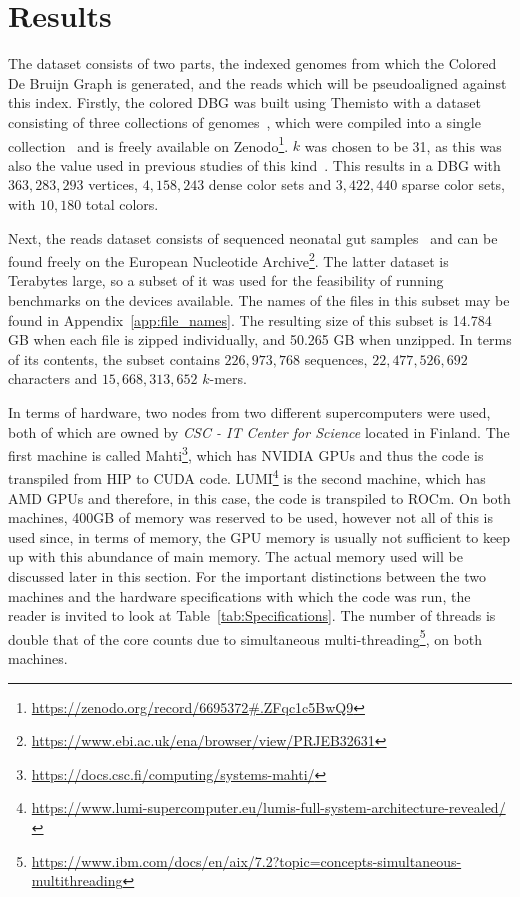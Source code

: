 \chapter{Results}\label{ch:Results}

The dataset consists of two parts, the indexed genomes from which the Colored De Bruijn Graph is generated, and the reads which will be pseudoaligned against this index.
Firstly, the colored DBG was built using Themisto with a dataset consisting of three collections of genomes~\cite{ecoli_genomes_1, ecoli_genomes_2, ecoli_genomes_3}, which were compiled into a single collection~\cite{genomes_compilation} and is freely available on Zenodo\footnote{\url{https://zenodo.org/record/6695372#.ZFqc1c5BwQ9}}.
$k$ was chosen to be 31, as this was also the value used in previous studies of this kind~\cite{Harri, SBWT}.
This results in a DBG with $363,283,293$ vertices, $4,158,243$ dense color sets and $3,422,440$ sparse color sets, with $10,180$ total colors.

Next, the reads dataset consists of sequenced neonatal gut samples~\cite{ecoli_genomes_3} and can be found freely on the European Nucleotide Archive\footnote{\url{https://www.ebi.ac.uk/ena/browser/view/PRJEB32631}}.
The latter dataset is Terabytes large, so a subset of it was used for the feasibility of running benchmarks on the devices available.
The names of the files in this subset may be found in Appendix~\ref{app:file_names}.
The resulting size of this subset is 14.784 GB when each file is zipped individually, and 50.265 GB when unzipped.
In terms of its contents, the subset contains $226,973,768$ sequences, $22,477,526,692$ characters and $15,668,313,652$ $k$-mers.

In terms of hardware, two nodes from two different supercomputers were used, both of which are owned by \textit{CSC - IT Center for Science} located in Finland.
The first machine is called Mahti\footnote{\url{https://docs.csc.fi/computing/systems-mahti/}}, which has NVIDIA GPUs and thus the code is transpiled from HIP to CUDA code.
LUMI\footnote{\url{https://www.lumi-supercomputer.eu/lumis-full-system-architecture-revealed/}} is the second machine, which has AMD GPUs and therefore, in this case, the code is transpiled to ROCm\texttrademark.
On both machines, 400GB of memory was reserved to be used, however not all of this is used since, in terms of memory, the GPU memory is usually not sufficient to keep up with this abundance of main memory.
The actual memory used will be discussed later in this section.
For the important distinctions between the two machines and the hardware specifications with which the code was run, the reader is invited to look at Table~\ref{tab:Specifications}.
The number of threads is double that of the core counts due to simultaneous multi-threading\footnote{\url{https://www.ibm.com/docs/en/aix/7.2?topic=concepts-simultaneous-multithreading}}, on both machines.

